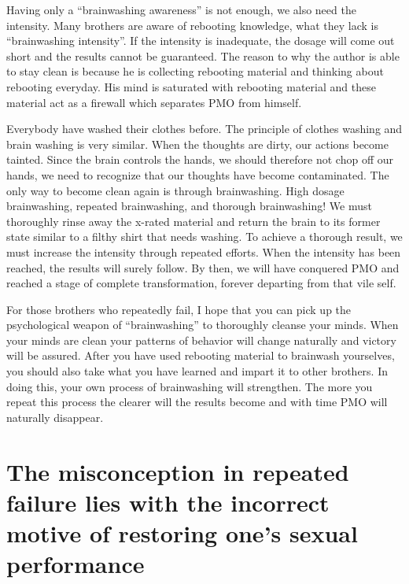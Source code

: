 \documentclass[
]{book}
\begin{document}
Having only a ``brainwashing awareness'' is not enough, we also need the intensity. Many brothers are aware of rebooting knowledge, what they lack is ``brainwashing intensity''. If the intensity is inadequate, the dosage will come out short and the results cannot be guaranteed. The reason to why the author is able to stay clean is because he is collecting rebooting material and thinking about rebooting everyday. His mind is saturated with rebooting material and these material act as a firewall which separates PMO from himself.

Everybody have washed their clothes before. The principle of clothes washing and brain washing is very similar. When the thoughts are dirty, our actions become tainted. Since the brain controls the hands, we should therefore not chop off our hands, we need to recognize that our thoughts have become contaminated. The only way to become clean again is through brainwashing. High dosage brainwashing, repeated brainwashing, and thorough brainwashing! We must thoroughly rinse away the x-rated material and return the brain to its former state similar to a filthy shirt that needs washing. To achieve a thorough result, we must increase the intensity through repeated efforts. When the intensity has been reached, the results will surely follow. By then, we will have conquered PMO and reached a stage of complete transformation, forever departing from that vile self.

For those brothers who repeatedly fail, I hope that you can pick up the psychological weapon of ``brainwashing'' to thoroughly cleanse your minds. When your minds are clean your patterns of behavior will change naturally and victory will be assured. After you have used rebooting material to brainwash yourselves, you should also take what you have learned and impart it to other brothers. In doing this, your own process of brainwashing will strengthen. The more you repeat this process the clearer will the results become and with time PMO will naturally disappear.

\hypertarget{the-misconception-in-repeated-failure-lies-with-the-incorrect-motive-of-restoring-ones-sexual-performance}{%
\chapter{The misconception in repeated failure lies with the incorrect motive of restoring one's sexual performance}\label{the-misconception-in-repeated-failure-lies-with-the-incorrect-motive-of-restoring-ones-sexual-performance}}
\end{document}
